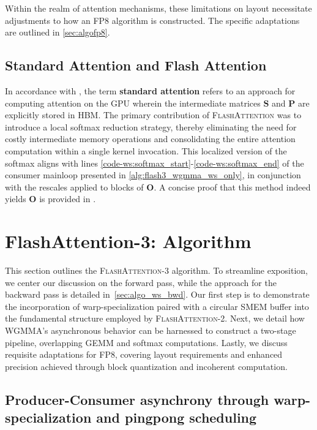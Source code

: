 \begin{enumerate}
Within the realm of attention mechanisms, these limitations on layout necessitate adjustments to how an FP8 algorithm is constructed. The specific adaptations are outlined in \cref{sec:algofp8}.

\subsection{Standard Attention and Flash Attention} In accordance with \citet{dao2022flashattention}, the term \textbf{standard attention} refers to an approach for computing attention on the GPU wherein the intermediate matrices $\mathbf{S}$ and $\mathbf{P}$ are explicitly stored in HBM. The primary contribution of \textsc{FlashAttention} was to introduce a local softmax reduction strategy, thereby eliminating the need for costly intermediate memory operations and consolidating the entire attention computation within a single kernel invocation. This localized version of the softmax aligns with lines \ref{code-ws:softmax_start}-\ref{code-ws:softmax_end} of the consumer mainloop presented in \cref{alg:flash3_wgmma_ws_only}, in conjunction with the rescales applied to blocks of $\mathbf{O}$. A concise proof that this method indeed yields $\mathbf{O}$ is provided in \cite[\S 2.3.1]{dao2023flashattention2}.

\section{FlashAttention-3: Algorithm}
\label{sec:algo}

This section outlines the \textsc{FlashAttention-3} algorithm. To streamline exposition, we center our discussion on the forward pass, while the approach for the backward pass is detailed in~\cref{sec:algo_ws_bwd}. Our first step is to demonstrate the incorporation of warp-specialization paired with a circular SMEM buffer into the fundamental structure employed by \textsc{FlashAttention-2}. Next, we detail how WGMMA’s asynchronous behavior can be harnessed to construct a two-stage pipeline, overlapping GEMM and softmax computations. Lastly, we discuss requisite adaptations for FP8, covering layout requirements and enhanced precision achieved through block quantization and incoherent computation.

\subsection{Producer-Consumer asynchrony through warp-specialization and pingpong scheduling}
\label{sec:algo_ws}


\end{enumerate}
